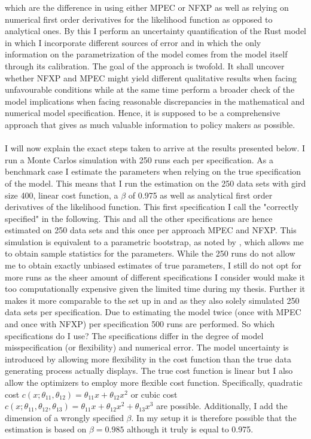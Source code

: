 which are the difference in using either MPEC or NFXP as well as relying on numerical first order derivatives for the likelihood function as opposed to analytical ones. By this I perform an uncertainty quantification of the Rust model in which I incorporate different sources of error and in which the only information on the parametrization of the model comes from the model itself through its calibration. The goal of the approach is twofold. It shall uncover whether NFXP and MPEC might yield different qualitative results when facing unfavourable conditions while at the same time perform a broader check of the model implications when facing reasonable discrepancies in the mathematical and numerical model specification. Hence, it is supposed to be a comprehensive approach that gives as much valuable information to policy makers as possible. \paragraph{}

I will now explain the exact steps taken to arrive at the results presented below. I run a Monte Carlos simulation with 250 runs each per specification. As a benchmark case I estimate the parameters when relying on the true specification of the model. This means that I run the estimation on the 250 data sets with gird size 400, linear cost function, a $\beta$ of 0.975 as well as analytical first order derivatives of the likelihood function. This first specification I call the "correctly specified" in the following. This and all the other specifications are hence estimated on 250 data sets and this once per approach MPEC and NFXP. This simulation is equivalent to a parametric bootstrap, as noted by \cite{Su.Judd.2012}, which allows me to obtain sample statistics for the parameters. While the 250 runs do not allow me to obtain exactly unbiased estimates of true parameters, I still do not opt for more runs as the sheer amount of different specifications I consider would make it too computationally expensive given the limited time during my thesis. Further it makes it more comparable to the set up in \cite{Iskhakov.2016} and \cite{Su.Judd.2012} as they also solely simulated 250 data sets per specification. Due to estimating the model twice (once with MPEC and once with NFXP) per specification 500 runs are performed. So which specifications do I use? The specifications differ in the degree of model misspecification (or flexibility) and numerical error. The model uncertainty is introduced by allowing more flexibility in the cost function than the true data generating process actually displays. The true cost function is linear but I also allow the optimizers to employ more flexible cost function. Specifically, quadratic cost $c(x; \theta_{11}, \theta_{12}) = \theta_{11}x + \theta_{12}x^2$ or cubic cost $c(x; \theta_{11}, \theta_{12}, \theta_{13}) = \theta_{11}x + \theta_{12}x^2 + \theta_{13}x^3$ are possible. Additionally, I add the dimension of a wrongly specified $\beta$. In my setup it is therefore possible that the estimation is based on $\beta = 0.985$ although it truly is equal to 0.975.

